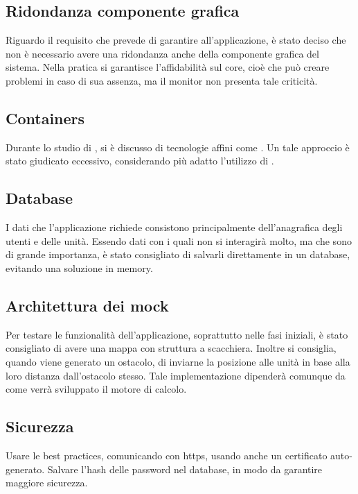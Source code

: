 \documentclass[]{article}
\begin{document}
		\subsection{Ridondanza componente grafica}
		Riguardo il requisito che prevede di garantire  all'applicazione, è stato deciso che non è necessario avere una ridondanza anche della componente grafica del sistema. Nella pratica si garantisce l'affidabilità sul core, cioè che può creare problemi in caso di sua assenza, ma il monitor non presenta tale criticità.
		
		\subsection{Containers}
		Durante lo studio di , si è discusso di tecnologie affini come . Un tale approccio è stato giudicato eccessivo, considerando più adatto l'utilizzo di .
		
		\subsection{Database}
		I dati che l'applicazione richiede consistono principalmente dell'anagrafica degli utenti e delle unità. Essendo dati con i quali non si interagirà molto, ma che sono di grande importanza, è stato consigliato di salvarli direttamente in un database, evitando una soluzione in memory.
		
		\subsection{Architettura dei mock}
		Per testare le funzionalità dell'applicazione, soprattutto nelle fasi iniziali, è stato consigliato di avere una mappa con struttura a scacchiera. Inoltre si consiglia, quando viene generato un ostacolo, di inviarne la posizione alle unità in base alla loro distanza dall'ostacolo stesso. Tale implementazione dipenderà comunque da come verrà sviluppato il motore di calcolo.
		
		\subsection{Sicurezza}	
		Usare le best practices, comunicando con https, usando anche un certificato auto-generato. Salvare l'hash delle password nel database, in modo da garantire maggiore sicurezza.
		
	\newpage
	
\end{document}
